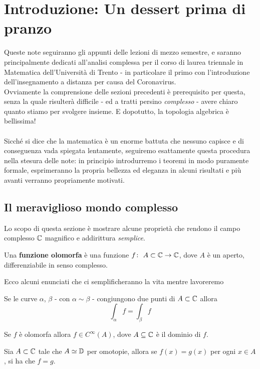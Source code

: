 \chapter* {Introduzione: Un dessert prima di pranzo}

Queste note seguiranno gli appunti delle lezioni di mezzo semestre, e saranno principalmente dedicati all'analisi complessa per il corso di laurea triennale in Matematica dell'Università di Trento - in particolare il primo con l'introduzione dell'insegnamento a distanza per causa del Coronavirus. \\
Ovviamente la comprensione delle sezioni precedenti è prerequisito per questa, senza la quale risulterà difficile - ed a tratti persino \textit{complesso} - avere chiaro quanto stiamo per svolgere insieme. E dopotutto, la topologia algebrica è bellissima! \\ \\
Sicché si dice che la matematica è un enorme battuta che nessuno capisce e di conseguenza vada spiegata lentamente, 
seguiremo esattamente questa procedura nella stesura delle note: in principio introdurremo i teoremi in modo puramente formale, esprimeranno la propria bellezza ed eleganza in alcuni risultati 
e più avanti verranno propriamente motivati.

\section{Il meraviglioso mondo complesso}

Lo scopo di questa sezione è mostrare alcune proprietà che rendono il campo complesso $\mathbb{C}$ magnifico e addirittura \textit{semplice}.

\begin{definition}
	Una \textbf{funzione olomorfa} è una funzione $f \colon\ A \subset \mathbb{C} \rightarrow \mathbb{C}$, dove $A$ è un aperto, differenziabile in senso complesso. 
\end{definition}

Ecco alcuni enunciati che ci semplificheranno la vita mentre lavoreremo
\begin{theorem}
	Se le curve $\alpha$, $\beta$ - con $\alpha \sim \beta$ - congiungono due punti di $A \subset \mathbb{C}$ allora 
	\begin{equation*}
	\int_\alpha f = \int_\beta f
	\end{equation*}
\end{theorem}

\begin{theorem}[Regolarità]
	Se $f$ è olomorfa allora $f \in C^{\infty}(A)$, dove $A\subseteq \mathbb{C}$ è il dominio di $f$.
\end{theorem}

\begin{theorem}
	Sia $A\subset \mathbb{C}$ tale che $A \simeq \mathbb{D}$ per omotopie, allora se $f(x) = g(x)$ per ogni $x\in A$, si ha che  $f = g$.
\end{theorem}
